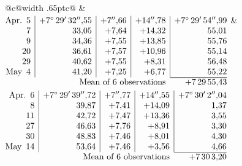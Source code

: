 \noindent\begin{tabular}{@{}c@{\hspace{.4em}\vrule width .65pt\hspace{.4em}}c@{}}
 &
 \\[.18ex]
\(\begin{array}[t]{@{}r|r|r|r|r@{}}
\text{Apr.}\enspace 5 & +7^\circ\,29'\,32''{,}55 & +7''{,}66 & +14''{,}78 & +7^\circ\,29'\,54''{,}99\\
7 & 33{,}05 & +7{,}64 & +14{,}32 & 55{,}01\\
9 & 34{,}36 & +7{,}55 & +13{,}85 & 55{,}76\\
20 & 36{,}61 & +7{,}57 & +10{,}96 & 55{,}14\\
29 & 40{,}62 & +7{,}55 & +8{,}31 & 56{,}48\\
\text{May}\enspace 4 & 41{,}20 & +7{,}25 & +6{,}77 & 55{,}22\\
\cline{5-5}
\multicolumn{4}{r}{\text{Mean of 6 observations}} & +7\,29\,55{,}43
\end{array}\)
&
\(\begin{array}[t]{@{}r|r|r|r|r@{}}
\text{Apr.}\enspace 6 & +7^\circ\,29'\,39''{,}72 & +7''{,}77 & +14''{,}55 & +7^\circ\,30'\,2''{,}04\\
8 & 39{,}87 & +7{,}41 & +14{,}09 & 1{,}37\\
11 & 42{,}72 & +7{,}47 & +13{,}36 & 3{,}55\\
27 & 46{,}63 & +7{,}76 & +8{,}91 & 3{,}30\\
30 & 48{,}83 & +7{,}46 & +8{,}01 & 4{,}30\\
\text{May}\enspace 14 & 53{,}64 & +7{,}46 & +3{,}56 & 4{,}66\\
\cline{5-5}
\multicolumn{4}{r}{\text{Mean of 6 observations}} & +7\,30\,3{,}20
\end{array}\)
\end{tabular}\par\medskip
